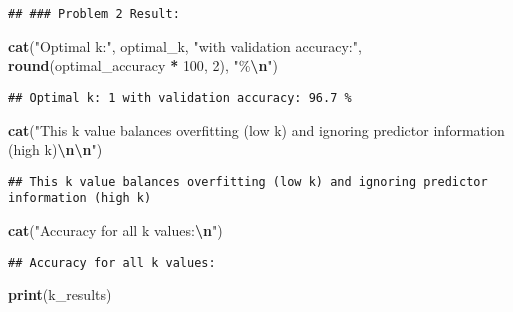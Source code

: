\documentclass[
]{article}
\newenvironment{Shaded}{\begin{snugshade}}{\end{snugshade}}
\newcommand{\DecValTok}[1]{\textcolor[rgb]{0.00,0.00,0.81}{#1}}
\newcommand{\FunctionTok}[1]{\textcolor[rgb]{0.13,0.29,0.53}{\textbf{#1}}}
\newcommand{\NormalTok}[1]{#1}
\newcommand{\SpecialCharTok}[1]{\textcolor[rgb]{0.81,0.36,0.00}{\textbf{#1}}}
\newcommand{\StringTok}[1]{\textcolor[rgb]{0.31,0.60,0.02}{#1}}
\begin{document}
\begin{verbatim}
## ### Problem 2 Result:
\end{verbatim}

\begin{Shaded}
\begin{Highlighting}[]
\FunctionTok{cat}\NormalTok{(}\StringTok{"Optimal k:"}\NormalTok{, optimal\_k, }\StringTok{"with validation accuracy:"}\NormalTok{, }\FunctionTok{round}\NormalTok{(optimal\_accuracy }\SpecialCharTok{*} \DecValTok{100}\NormalTok{, }\DecValTok{2}\NormalTok{), }\StringTok{"\%}\SpecialCharTok{\textbackslash{}n}\StringTok{"}\NormalTok{)}
\end{Highlighting}
\end{Shaded}

\begin{verbatim}
## Optimal k: 1 with validation accuracy: 96.7 %
\end{verbatim}

\begin{Shaded}
\begin{Highlighting}[]
\FunctionTok{cat}\NormalTok{(}\StringTok{"This k value balances overfitting (low k) and ignoring predictor information (high k)}\SpecialCharTok{\textbackslash{}n\textbackslash{}n}\StringTok{"}\NormalTok{)}
\end{Highlighting}
\end{Shaded}

\begin{verbatim}
## This k value balances overfitting (low k) and ignoring predictor information (high k)
\end{verbatim}

\begin{Shaded}
\begin{Highlighting}[]
\FunctionTok{cat}\NormalTok{(}\StringTok{"Accuracy for all k values:}\SpecialCharTok{\textbackslash{}n}\StringTok{"}\NormalTok{)}
\end{Highlighting}
\end{Shaded}

\begin{verbatim}
## Accuracy for all k values:
\end{verbatim}

\begin{Shaded}
\begin{Highlighting}[]
\FunctionTok{print}\NormalTok{(k\_results)}
\end{Highlighting}
\end{Shaded}
\end{document}
